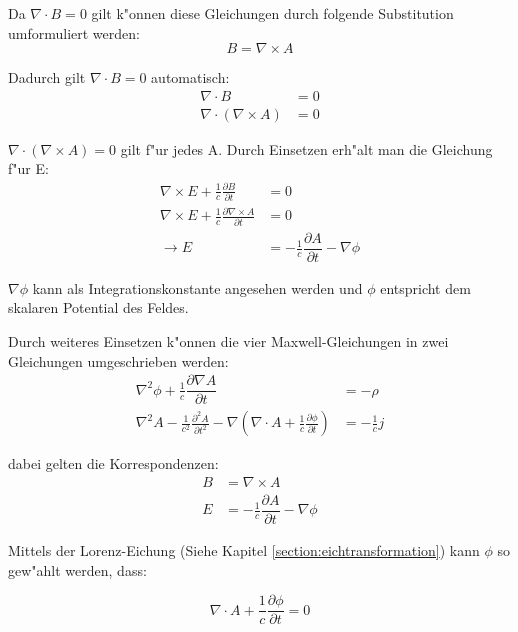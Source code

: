Da $\nabla \cdot B = 0 $ gilt k"onnen diese Gleichungen durch folgende Substitution umformuliert werden:
\begin{equation}
B = \nabla\times A 
\end{equation}

Dadurch gilt $\nabla \cdot B = 0 $ automatisch:
\begin{align}
\nabla \cdot B &= 0 \\
\nabla \cdot ( \nabla\times A ) &= 0
\end{align}

$\nabla \cdot ( \nabla\times A ) = 0$ gilt f"ur jedes A. Durch Einsetzen erh"alt man die Gleichung f"ur E:
\begin{align}
\nabla\times E + \frac{1}{c} \frac{\partial B }{\partial t} &= 0 \\
\nabla\times E + \frac{1}{c} \frac{\partial \nabla\times A }{\partial t} &= 0 \\
\rightarrow E &= -\frac{1}{c} \dfrac{\partial A}{\partial t} - \nabla \phi
\end{align}

$\nabla \phi$ kann als Integrationskonstante angesehen werden und $\phi$ entspricht dem skalaren Potential des Feldes.

Durch weiteres Einsetzen k"onnen die vier Maxwell-Gleichungen in zwei Gleichungen umgeschrieben werden:
\begin{align} 
 \label{fq:a_coupled_a}
 \nabla^2 \phi + \frac{1}{c} \dfrac{\partial \nabla A}{\partial t} &= -\rho \\
 \label{fq:a_coupled_b}
 \nabla^2 A - \frac{1}{c^2} \frac{\partial^2 A }{\partial t^2} - \nabla \left( \nabla \cdot A + \frac{1}{c} \frac{\partial \phi }{\partial t} \right) &= - \frac{1}{c} j
\end{align}

dabei gelten die Korrespondenzen:
\begin{equation}
\begin{split}
B &= \nabla\times A \\
E &= -\frac{1}{c} \dfrac{\partial A}{\partial t} - \nabla \phi
\end{split}
\end{equation}

Mittels der Lorenz-Eichung (Siehe Kapitel \ref{section:eichtransformation}) kann $\phi$ so gew"ahlt werden, dass:

\begin{equation}
\nabla \cdot A + \frac{1}{c} \frac{\partial \phi }{\partial t} = 0
\end{equation}

